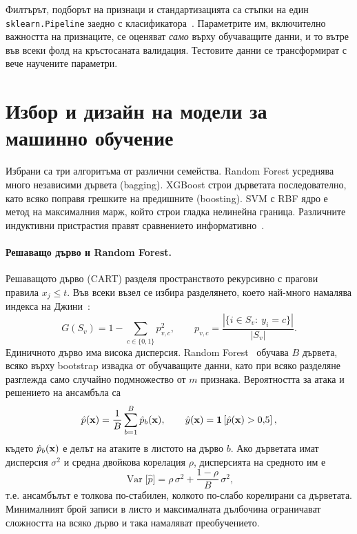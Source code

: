 \begin{notebox}
Филтърът, подборът на признаци и стандартизацията са стъпки на един \texttt{sklearn.Pipeline} заедно с класификатора~\cite{pedregosa2011}. Параметрите им, включително важността на признаците, се оценяват \emph{само} върху обучаващите данни, и то вътре във всеки фолд на кръстосаната валидация. Тестовите данни се трансформират с вече научените параметри.
\end{notebox}

\section{Избор и дизайн на модели за машинно обучение}\label{sec:models}

Избрани са три алгоритъма от различни семейства. Random Forest усреднява много независими дървета (bagging). XGBoost строи дърветата последователно, като всяко поправя грешките на предишните (boosting). SVM с RBF ядро е метод на максималния марж, който строи гладка нелинейна граница. Различните индуктивни пристрастия правят сравнението информативно~\cite{hastie2009}.

\paragraph{Решаващо дърво и Random Forest.} Решаващото дърво (CART) разделя пространството рекурсивно с прагови правила $x_j\le t$. Във всеки възел се избира разделянето, което най-много намалява индекса на Джини~\cite{breiman1984}:
\begin{equation}\label{eq:gini}
G(S_v)=1-\sum_{c\in\{0,1\}}p_{v,c}^2,\qquad p_{v,c}=\frac{|\{i\in S_v:\ y_i=c\}|}{|S_v|}.
\end{equation}
Единичното дърво има висока дисперсия. Random Forest~\cite{breiman2001} обучава $B$ дървета, всяко върху bootstrap извадка от обучаващите данни, като при всяко разделяне разглежда само случайно подмножество от $m$ признака. Вероятността за атака и решението на ансамбъла са
\begin{equation}\label{eq:rf}
\hat{p}(\mathbf{x})=\frac{1}{B}\sum_{b=1}^{B}\hat{p}_b(\mathbf{x}),\qquad \hat{y}(\mathbf{x})=\mathbf{1}\left[\hat{p}(\mathbf{x})>0{,}5\right],
\end{equation}
където $\hat{p}_b(\mathbf{x})$ е делът на атаките в листото на дърво $b$. Ако дърветата имат дисперсия $\sigma^2$ и средна двойкова корелация $\rho$, дисперсията на средното им е~\cite{hastie2009}
\begin{equation}\label{eq:rf-var}
\operatorname{Var}\bigl[\hat{p}\bigr]=\rho\,\sigma^2+\frac{1-\rho}{B}\,\sigma^2,
\end{equation}
т.е. ансамбълът е толкова по-стабилен, колкото по-слабо корелирани са дърветата. Минималният брой записи в листо и максималната дълбочина ограничават сложността на всяко дърво и така намаляват преобучението.

